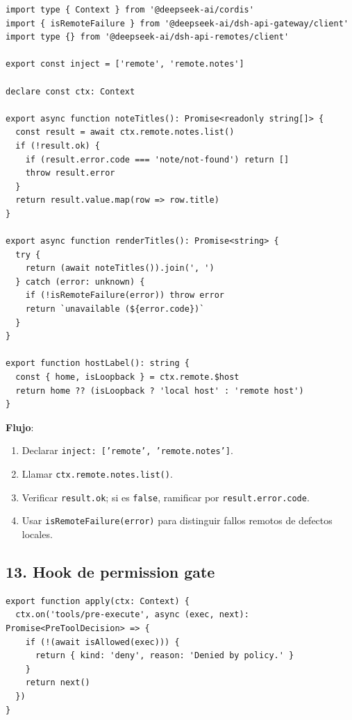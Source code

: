 \documentclass[11pt,a4paper]{article}
\begin{document}
\begin{lstlisting}
import type { Context } from '@deepseek-ai/cordis'
import { isRemoteFailure } from '@deepseek-ai/dsh-api-gateway/client'
import type {} from '@deepseek-ai/dsh-api-remotes/client'

export const inject = ['remote', 'remote.notes']

declare const ctx: Context

export async function noteTitles(): Promise<readonly string[]> {
  const result = await ctx.remote.notes.list()
  if (!result.ok) {
    if (result.error.code === 'note/not-found') return []
    throw result.error
  }
  return result.value.map(row => row.title)
}

export async function renderTitles(): Promise<string> {
  try {
    return (await noteTitles()).join(', ')
  } catch (error: unknown) {
    if (!isRemoteFailure(error)) throw error
    return `unavailable (${error.code})`
  }
}

export function hostLabel(): string {
  const { home, isLoopback } = ctx.remote.$host
  return home ?? (isLoopback ? 'local host' : 'remote host')
}
\end{lstlisting}


\textbf{Flujo}:


\begin{enumerate}[leftmargin=*,topsep=2pt,itemsep=1pt]
  \item Declarar \texttt{inject: ['remote', 'remote.notes']}.
  \item Llamar \texttt{ctx.remote.notes.list()}.
  \item Verificar \texttt{result.ok}; si es \texttt{false}, ramificar por \texttt{result.error.code}.
  \item Usar \texttt{isRemoteFailure(error)} para distinguir fallos remotos de defectos locales.
\end{enumerate}


\subsection*{13. Hook de permission gate}


\begin{lstlisting}
export function apply(ctx: Context) {
  ctx.on('tools/pre-execute', async (exec, next): Promise<PreToolDecision> => {
    if (!(await isAllowed(exec))) {
      return { kind: 'deny', reason: 'Denied by policy.' }
    }
    return next()
  })
}
\end{lstlisting}
\end{document}
